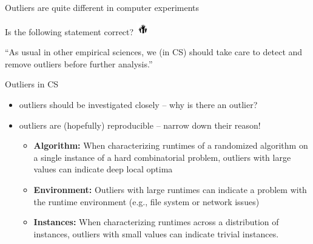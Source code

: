 \begin{frame}[c]{Outliers are quite different in computer experiments}

Is the following statement correct? \includegraphics[height=1.5em]{images/hands}

``As usual in other empirical sciences, we (in CS) should take care to \alert{detect and remove outliers} before further analysis.''

\pause
\bigskip

\begin{block}{Outliers in CS}
\begin{itemize}
  \item outliers should be investigated closely -- why is there an outlier?
  \item outliers are (hopefully) reproducible -- narrow down their reason!
  \pause
  \begin{itemize}
    \item \textbf{Algorithm:} When characterizing runtimes of a randomized algorithm on a single instance of a hard combinatorial problem, \alert{outliers with large values can indicate deep local optima}
    \pause
    \item \textbf{Environment:} Outliers with large runtimes can indicate a \alert{problem with the runtime environment} (e.g., file system or network issues)
    \pause
    \item \textbf{Instances:}  When characterizing runtimes across a distribution of instances, outliers with small values can indicate trivial instances.
  \end{itemize}
\end{itemize}
\end{block}

\end{frame}
